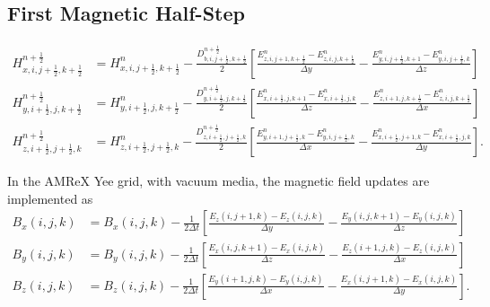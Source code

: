 \documentclass{article}
\numberwithin{equation}{section}
\numberwithin{figure}{section}
\begin{document}
\subsection{First Magnetic Half-Step}
\begin{subequations}\label{eq:fdtd-first-h-half}
    \begin{align}
        H_{x,i,j+\frac{1}{2},k+\frac{1}{2}}^{n+\frac{1}{2}} & = H_{x,i,j+\frac{1}{2},k+\frac{1}{2}}^n - \frac{D_{b,i,j+\frac{1}{2},k+\frac{1}{2}}^{n+\frac{1}{2}}}{2} \left[\frac{E_{z,i,j+1,k+\frac{1}{2}}^n-E_{z,i,j,k+\frac{1}{2}}^n}{\Delta y} - \frac{E_{y,i,j+\frac{1}{2},k+1}^n-E_{y,i,j+\frac{1}{2},k}^n}{\Delta z}\right]
        \label{eq:fdtd-first-hx}                                                                                                                                                                                                                                                                                                    \\
        H_{y,i+\frac{1}{2},j,k+\frac{1}{2}}^{n+\frac{1}{2}} & = H_{y,i+\frac{1}{2},j,k+\frac{1}{2}}^n - \frac{D_{y,i+\frac{1}{2},j,k+\frac{1}{2}}^{n+\frac{1}{2}}}{2} \left[\frac{E_{x,i+\frac{1}{2},j,k+1}^n-E_{x,i+\frac{1}{2},j,k}^n}{\Delta z} - \frac{E_{z,i+1,j,k+\frac{1}{2}}^n-E_{z,i,j,k+\frac{1}{2}}^n}{\Delta x}\right]
        \label{eq:fdtd-first-hy}                                                                                                                                                                                                                                                                                                    \\
        H_{z,i+\frac{1}{2},j+\frac{1}{2},k}^{n+\frac{1}{2}} & = H_{z,i+\frac{1}{2},j+\frac{1}{2},k}^n - \frac{D_{z,i+\frac{1}{2},j+\frac{1}{2},k}^{n+\frac{1}{2}}}{2} \left[\frac{E_{y,i+1,j+\frac{1}{2},k}^n-E_{y,i,j+\frac{1}{2},k}^n}{\Delta x} - \frac{E_{x,i+\frac{1}{2},j+1,k}^n-E_{x,i+\frac{1}{2},j,k}^n}{\Delta y}\right].
        \label{eq:fdtd-first-hz}
    \end{align}
\end{subequations}

In the AMReX Yee grid, with vacuum media, the magnetic field updates are implemented as
\begin{subequations}\label{eq:fdtd-first-h-half-amrex}
    \begin{align}
        B_x(i, j, k) & = B_x(i, j, k) - \frac{1}{2\Delta t} \left[\frac{E_z(i, j + 1, k) - E_z(i, j, k)}{\Delta y} - \frac{E_y(i, j, k + 1) - E_y(i, j, k)}{\Delta z}\right]  \\
        B_y(i, j, k) & = B_y(i, j, k) - \frac{1}{2\Delta t} \left[\frac{E_x(i, j, k + 1) - E_x(i, j, k)}{\Delta z} - \frac{E_z(i + 1, j, k) - E_z(i, j, k)}{\Delta x}\right]  \\
        B_z(i, j, k) & = B_z(i, j, k) - \frac{1}{2\Delta t} \left[\frac{E_y(i + 1, j, k) - E_y(i, j, k)}{\Delta x} - \frac{E_x(i, j + 1, k) - E_x(i, j, k)}{\Delta y}\right].
    \end{align}
\end{subequations}
\end{document}
